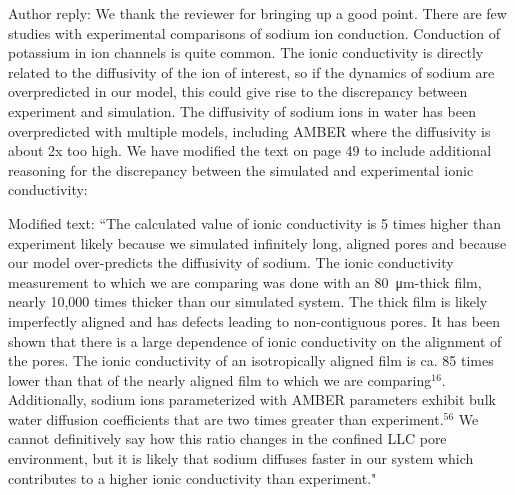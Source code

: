 \documentclass{article}
\begin{document}
\begin{enumerate}
	Author reply: We thank the reviewer for bringing up a good point. There are few studies
	with experimental comparisons of sodium ion conduction. Conduction of potassium in 
	ion channels is quite common. The ionic conductivity is directly related to the 
	diffusivity of the ion of interest, so if the dynamics of sodium are overpredicted
	in our model, this could give rise to the discrepancy between experiment and simulation.
	The diffusivity of sodium ions in water has been overpredicted with multiple models, 
	including AMBER where the diffusivity is about 2x too high. We have modified the text 
	on page 49 to include additional reasoning for the 
	discrepancy between the simulated and experimental ionic conductivity:
	
    
    Modified text: ``The calculated value of ionic conductivity is 5 times higher than
    experiment likely because we simulated infinitely long, aligned pores {\color{red} and
    because our model over-predicts the diffusivity of sodium}. The ionic conductivity 
    measurement to which we are comparing was done with an \SI{80}{\micro\metre}-thick film, 
    nearly 10,000 times thicker than our simulated system. The thick film is likely 
    imperfectly aligned and has defects leading to non-contiguous pores. It has been shown
    that there is a large dependence of ionic conductivity on the alignment of the pores.
    The ionic conductivity of an isotropically aligned film is ca. 85 times lower than that
    of the nearly aligned film to which we are comparing$^{16}$. 
    {\color{red} Additionally, sodium ions parameterized with AMBER parameters exhibit bulk
    water diffusion coefficients that are two times greater than experiment.$^{56}$ We cannot 
    definitively say how this ratio changes in the confined LLC pore environment, but
    it is likely that sodium diffuses faster in our system which contributes to a higher 
    ionic conductivity than experiment.}"
	

\end{enumerate}
\end{document}
